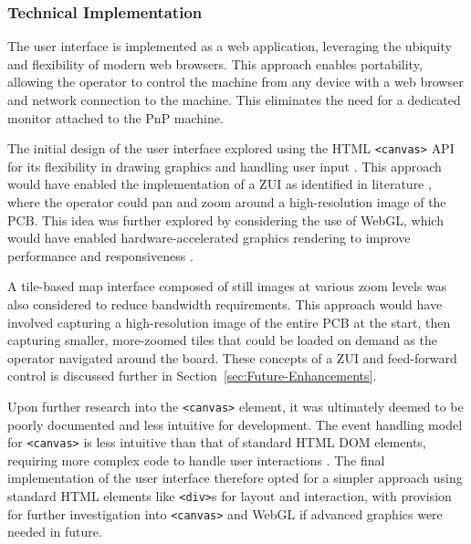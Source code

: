 \documentclass[12pt,british,UKenglish]{article}
\begin{document}
\subsubsection{Technical Implementation}\label{sec:User-Interface-Technical}

The user interface is implemented as a web application, leveraging the ubiquity and flexibility of modern web browsers.
This approach enables portability, allowing the operator to control the machine from any device with a web browser and network connection to the machine.
This eliminates the need for a dedicated monitor attached to the \ac{PnP} machine.


The initial design of the user interface explored using the \ac{HTML} \texttt{<canvas>} \ac{API} for its flexibility in drawing graphics and handling user input \cite{10109201}.
This approach would have enabled the implementation of a \acf{ZUI} as identified in literature \cite{doi:10.1080/0144929X.2011.586724}, where the operator could pan and zoom around a high-resolution image of the \ac{PCB}.
This idea was further explored by considering the use of \ac{WebGL}, which would have enabled hardware-accelerated graphics rendering to improve performance and responsiveness \cite{mozillaWebGLGraphics}.

A tile-based map interface composed of still images at various zoom levels was also considered to reduce bandwidth requirements.
This approach would have involved capturing a high-resolution image of the entire \ac{PCB} at the start, then capturing smaller, more-zoomed tiles that could be loaded on demand as the operator navigated around the board.
These concepts of a \ac{ZUI} and feed-forward control is discussed further in Section~\ref{sec:Future-Enhancements}.

Upon further research into the \texttt{<canvas>} element, it was ultimately deemed to be poorly documented \cite{10109201} and less intuitive for development.
The event handling model for \texttt{<canvas>} is less intuitive than that of standard \ac{HTML} \ac{DOM} elements, requiring more complex code to handle user interactions \cite{canvasEvents}.
The final implementation of the user interface therefore opted for a simpler approach using standard \ac{HTML} elements like \texttt{<div>}s for layout and interaction, with provision for further investigation into \texttt{<canvas>} and \ac{WebGL} if advanced graphics were needed in future.
\end{document}
